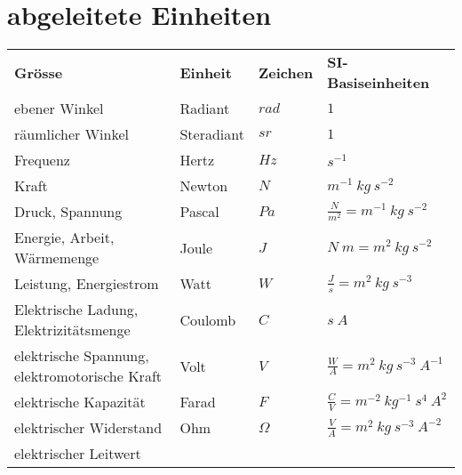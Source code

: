 \section{abgeleitete Einheiten}
\begin{footnotesize}
\begin{longtable}{p{}lll}
  \rowcolor{white}  \textbf{Grösse}
                    & \textbf{Einheit}
                    & \textbf{Zeichen}
                    & \textbf{SI-Basiseinheiten} \\
  \rowcolor{lgray}  ebener Winkel
                    & Radiant
                    & $rad$
                    & $1$ \\
  \rowcolor{white}  räumlicher Winkel
                    & Steradiant
                    & $sr$
                    & $1$ \\
  \rowcolor{lgray}  Frequenz
                    & Hertz
                    & $Hz$
                    & $s^{-1}$ \\
  \rowcolor{white}  Kraft
                    & Newton
                    & $N$
                    & $m^{-1}~kg~s^{-2}$ \\
  \rowcolor{lgray}  Druck, Spannung
                    & Pascal
                    & $Pa$
                    & $\frac{N}{m^2} = m^{-1}~kg~s^{-2}$ \\
  \rowcolor{white}  Energie, Arbeit, Wärmemenge
                    & Joule
                    & $J$
                    & $N~m = m^2~kg~s^{-2}$ \\
  \rowcolor{lgray}  Leistung, Energiestrom
                    & Watt
                    & $W$
                    & $\frac{J}{s} = m^2~kg~s^{-3}$ \\
  \rowcolor{white}  Elektrische Ladung, Elektrizitätsmenge
                    & Coulomb
                    & $C$
                    & $s~A$ \\
  \rowcolor{lgray}  elektrische Spannung, elektromotorische Kraft
                    & Volt
                    & $V$
                    & $\frac{W}{A} = m^2~kg~s^{-3}~A^{-1}$ \\
  \rowcolor{white}  elektrische Kapazität
                    & Farad
                    & $F$
                    & $\frac{C}{V} = m^{-2}~kg^{-1}~s^4~A^2$ \\
  \rowcolor{lgray}  elektrischer Widerstand
                    & Ohm
                    & $\Omega$
                    & $\frac{V}{A} = m^2~kg~s^{-3}~A^{-2}$ \\
  \rowcolor{white}  elektrischer Leitwert

\end{longtable}
\end{footnotesize}
